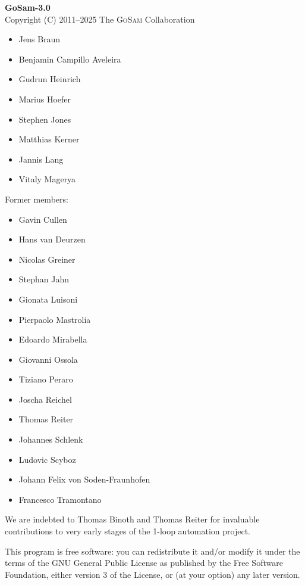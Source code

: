 \documentclass[11pt,a4paper, oneside]{scrbook}
\newcommand{\gosam}{\textsc{GoSam}\xspace}
\begin{document}
    \noindent\textbf{GoSam-3.0}  \\
    Copyright (C) 2011--2025  The \gosam Collaboration
   \begin{itemize}         
      \setlength\itemsep{-0.5em}
      \item Jens Braun
      \item Benjamin Campillo Aveleira      
      \item Gudrun Heinrich                  
      \item Marius Hoefer
      \item Stephen Jones
      \item Matthias Kerner
      \item Jannis Lang
      \item Vitaly Magerya

   \end{itemize}

    Former members:
    \begin{itemize}
      \setlength\itemsep{-0.5em}
      \item Gavin Cullen
      \item Hans van Deurzen
      \item Nicolas Greiner
      \item Stephan Jahn
      \item Gionata Luisoni
      \item Pierpaolo Mastrolia
      \item Edoardo Mirabella
      \item Giovanni Ossola
		\item Tiziano Peraro
      \item Joscha Reichel
		\item Thomas Reiter
		\item Johannes Schlenk
		\item Ludovic Scyboz
		\item Johann Felix von Soden-Fraunhofen
      \item Francesco Tramontano
    \end{itemize}
   
    We are indebted to Thomas Binoth and Thomas Reiter for invaluable contributions 
    to very early stages of the 1-loop automation project.
 
    This program is free software: you can redistribute it and/or modify
    it under the terms of the GNU General Public License as published by
    the Free Software Foundation, either version 3 of the License, or
    (at your option) any later version.
\end{document}
